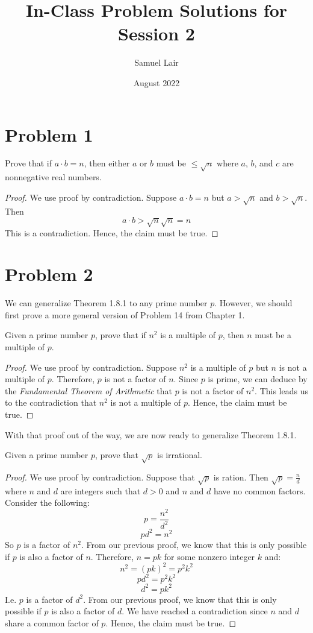 \documentclass{article}
\title{In-Class Problem Solutions for Session 2}
\author{Samuel Lair}
\date{August 2022}
\begin{document}
\maketitle
\tableofcontents

\pagebreak

\section{Problem 1}
Prove that if $a \cdot b = n$, then either $a$ or $b$ must be $\leq \sqrt{n}$ where $a$, $b$, and $c$ are nonnegative real numbers.
\begin{proof}
	We use proof by contradiction. Suppose $a \cdot b = n$ but $a > \sqrt{n}$ and $b > \sqrt{n}$. Then
	\[
		a \cdot b > \sqrt{n}\sqrt{n} = n
	\]
	This is a contradiction. Hence, the claim must be true.
\end{proof}

\pagebreak

\section{Problem 2}
We can generalize Theorem 1.8.1 to any prime number $p$. However, we should first prove a more general version of Problem 14 from Chapter 1.

Given a prime number $p$, prove that if $n^2$ is a multiple of $p$, then $n$ must be a multiple of $p$.
\begin{proof}
	We use proof by contradiction. Suppose $n^2$ is a multiple of $p$ but $n$ is not a multiple of $p$. Therefore, $p$ is not a factor of $n$. Since $p$ is prime, we can deduce by the \textit{Fundamental Theorem of Arithmetic} that $p$ is not a factor of $n^2$. This leads us to the contradiction that $n^2$ is not a multiple of $p$. Hence, the claim must be true.
\end{proof}

With that proof out of the way, we are now ready to generalize Theorem 1.8.1.

Given a prime number $p$, prove that $\sqrt{p}$ is irrational.
\begin{proof}
	We use proof by contradiction. Suppose that $\sqrt{p}$ is ration. Then $\sqrt{p} = \frac{n}{d}$ where $n$ and $d$ are integers such that $d > 0$ and $n$ and $d$ have no common factors. Consider the following:
	\[
		p = \frac{n^2}{d^2}
	\]
	\[
		p d^2 = n^2
	\]
	So $p$ is a factor of $n^2$. From our previous proof, we know that this is only possible if $p$ is also a factor of $n$. Therefore, $n = p k$ for some nonzero integer $k$ and:
	\[
		n^2 = (p k)^2 = p^2 k^2
	\]
	\[
		p d^2 = p^2 k^2
	\]
	\[
		d^2 = p k^2
	\]
	I.e. $p$ is a factor of $d^2$. From our previous proof, we know that this is only possible if $p$ is also a factor of $d$. We have reached a contradiction since $n$ and $d$ share a common factor of $p$. Hence, the claim must be true.
\end{proof}
\end{document}
